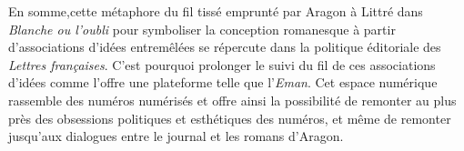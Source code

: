 En somme,cette métaphore du fil tissé emprunté par Aragon à Littré dans \emph{Blanche ou l'oubli} pour symboliser la conception romanesque à partir d'associations d'idées entremêlées se répercute dans la politique éditoriale des \emph{Lettres françaises}. C'est pourquoi prolonger le suivi du fil de ces associations d'idées comme l'offre une plateforme telle que l'\emph{Eman}. Cet espace numérique rassemble des numéros numérisés et offre ainsi la possibilité de remonter au plus près des obsessions politiques et esthétiques des numéros, et même de remonter jusqu'aux dialogues entre le journal et les romans d'Aragon. 